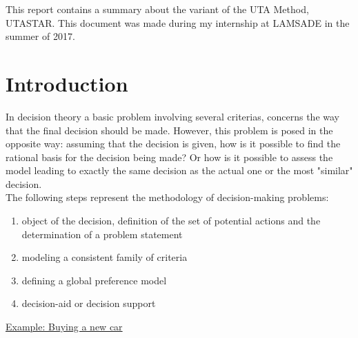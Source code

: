 \documentclass{report}
\begin{document}
\abstract This report contains a summary about the variant of the UTA Method, UTASTAR. This document was made during my internship at LAMSADE in the summer of 2017.
\tableofcontents{}

\chapter{Introduction}
In decision theory a basic problem involving several criterias, concerns the way that the final decision should be made. However, this problem is posed in the opposite way: assuming that the decision is given, how is it possible to find the rational basis for the decision being made? Or how is it possible to assess the model leading to exactly the same decision as the actual one or the most "similar" decision.\\

The following steps represent the methodology of decision-making problems: 
\begin{enumerate}
\item object of the decision, definition of the set of potential actions and the determination of a problem statement
\item modeling a consistent family of criteria
\item defining a global preference model
\item decision-aid or decision support
\end{enumerate}

\underline{Example: Buying a new car} \\
\end{document}
